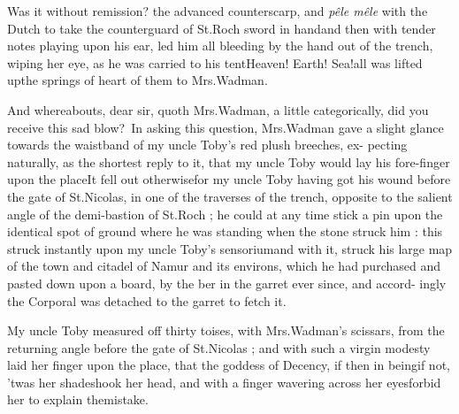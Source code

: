 \documentclass[twoside]{article}
\begin{document}
\lqq \tsh Was it without remission?\tsk\break
{}
\break 
{}
the advanced counterscarp, and \textit{pêle mêle}\etp{}
with the Dutch to take the counterguard of St.\@ Roch
sword in hand\tsk and then with tender notes playing upon his
ear, led him all bleeding by the hand out of the trench, wiping her
eye, as he was carried to his tent\tsh Heaven! Earth!
Sea!\tsk all was lifted up\tsk the springs of\break
{}
\break
heart of them to Mrs.\@ Wadman.

\tsk And whereabouts, dear sir, quoth Mrs.\@ Wadman, a
little categorically, did you receive this sad
blow?\tsk\ In asking this question, Mrs.\@ Wadman gave
a slight glance towards the waistband of my uncle
Toby’s red plush breeches, ex- pecting naturally, as the
shortest reply to it, that my uncle Toby would lay his
fore-finger upon the place\tsh It fell out
otherwise\tsh for my uncle Toby having got his wound before the gate of St.\@ Nicolas,
in one of the traverses of the trench, opposite to the salient angle
of the demi-bastion of St.\@ Roch ; he could at any time stick a
pin upon the identical spot of ground where he was standing when
the stone struck him : this struck instantly upon my uncle
Toby’s sensorium\tsh and with it, struck his
large map of the town and citadel of Namur and its environs,
which he had purchased and pasted down upon a board, by the\break
{}
ber in the garret ever since, and accord-\etp{} ingly the Corporal was detached to the garret to fetch
it.

My uncle Toby measured off thirty toises, with 
Mrs.\@ Wadman’s scissars, from the returning angle before the
gate of St.\@ Nicolas ; and with such a virgin modesty laid her
finger upon the place, that the goddess of Decency, if then in
being\tsk if not, ’twas her shade\tsk shook her head, and
with a finger wavering across her eyes\tsk forbid her to explain
the\break mistake.
\end{document}
